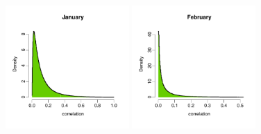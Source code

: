 \documentclass[a4paper, 12pt]{article}
\begin{document}
\newcommand{\scale}{12.7em}
\begin{figure}
\centering
 \includegraphics[width=\scale]{Validation_Plots/Correlation/Correlation_01_Jan}\hspace{-1ex}
 \includegraphics[width=\scale]{Validation_Plots/Correlation/Correlation_02_Feb}\hspace{-1ex}

\end{figure}
\end{document}
